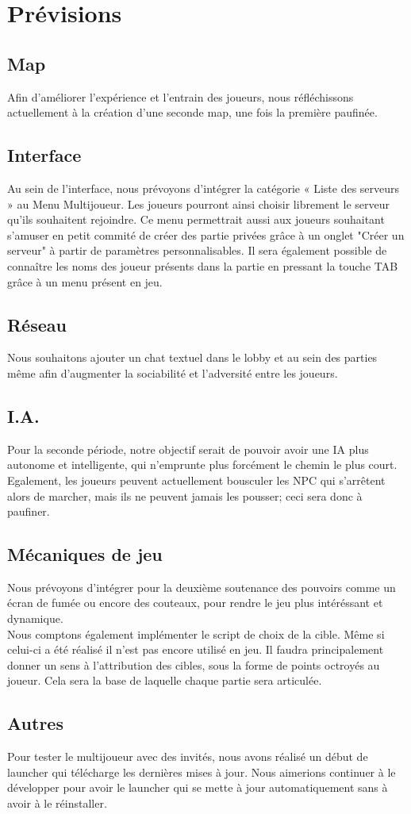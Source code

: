 \section{Prévisions}

\subsection{Map}
    Afin d'améliorer l'expérience et l'entrain des joueurs, nous réfléchissons actuellement à la création d'une seconde map, une fois la première paufinée.
\subsection{Interface}
    Au sein de l’interface, nous prévoyons d’intégrer la catégorie « Liste des serveurs » au Menu Multijoueur. 
    Les joueurs pourront ainsi choisir librement le serveur qu’ils souhaitent rejoindre. 
    Ce menu permettrait aussi aux joueurs souhaitant s'amuser en petit commité de créer des 
    partie privées grâce à un onglet "Créer un serveur" à partir de paramètres personnalisables. 
    Il sera également possible de connaître les noms des joueur présents dans la partie en pressant la touche TAB grâce à un menu présent en jeu.

\subsection{Réseau}
    Nous souhaitons ajouter un chat textuel dans le lobby et au sein des parties même afin d’augmenter la sociabilité et l’adversité entre les joueurs.

\subsection{I.A.}
    Pour la seconde période, notre objectif serait de pouvoir avoir une IA plus autonome et intelligente, qui n'emprunte plus forcément le chemin le plus court.
    Egalement, les joueurs peuvent actuellement bousculer les NPC qui s'arrêtent alors de marcher, mais ils ne peuvent jamais les pousser; ceci sera donc à paufiner.

\subsection{Mécaniques de jeu}
    Nous prévoyons d'intégrer pour la deuxième soutenance des pouvoirs
    comme un écran de fumée ou encore des couteaux,
    pour rendre le jeu plus intéréssant et dynamique.\\
    Nous comptons également implémenter le script de choix de la cible.
    Même si celui-ci a été réalisé il n'est pas encore utilisé en jeu.
    Il faudra principalement donner un sens à l'attribution des cibles,
    sous la forme de points octroyés au joueur.
    Cela sera la base de laquelle chaque partie sera articulée.

\subsection{Autres}
    Pour tester le multijoueur avec des invités, nous avons réalisé 
    un début de launcher qui télécharge les dernières mises à jour.
    Nous aimerions continuer à le développer pour avoir le launcher
    qui se mette à jour automatiquement sans à avoir à le réinstaller.
